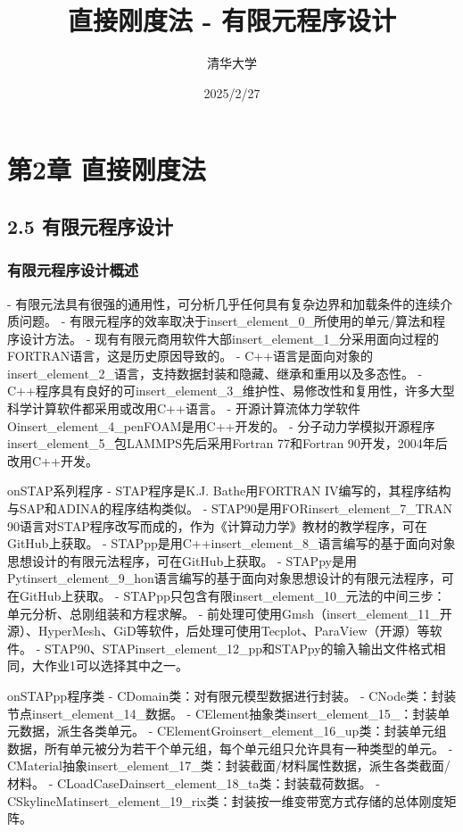 \documentclass{article}
\title{直接刚度法 - 有限元程序设计}
\author{清华大学}
\date{2025/2/27}
\begin{document}
\maketitle

\section{第2章 直接刚度法}
\subsection{2.5 有限元程序设计}

\subsubsection{有限元程序设计概述}
- 有限元法具有很强的通用性，可分析几乎任何具有复杂边界和加载条件的连续介质问题。
- 有限元程序的效率取决于{insert\_element\_0\_}所使用的单元/算法和程序设计方法。
- 现有有限元商用软件大部{insert\_element\_1\_}分采用面向过程的FORTRAN语言，这是历史原因导致的。
- C++语言是面向对象的{insert\_element\_2\_}语言，支持数据封装和隐藏、继承和重用以及多态性。
- C++程序具有良好的可{insert\_element\_3\_}维护性、易修改性和复用性，许多大型科学计算软件都采用或改用C++语言。
- 开源计算流体力学软件O{insert\_element\_4\_}penFOAM是用C++开发的。
- 分子动力学模拟开源程序{insert\_element\_5\_}包LAMMPS先后采用Fortran 77和Fortran 90开发，2004年后改用C++开发。

on{STAP系列程序}
- STAP程序是K.J. Bathe用FORTRAN IV编写的，其程序结构与SAP和ADINA的程序结构类似。
- STAP90是用FOR{insert\_element\_7\_}TRAN 90语言对STAP程序改写而成的，作为《计算动力学》教材的教学程序，可在GitHub上获取。
- STAPpp是用C++{insert\_element\_8\_}语言编写的基于面向对象思想设计的有限元法程序，可在GitHub上获取。
- STAPpy是用Pyt{insert\_element\_9\_}hon语言编写的基于面向对象思想设计的有限元法程序，可在GitHub上获取。
- STAPpp只包含有限{insert\_element\_10\_}元法的中间三步：单元分析、总刚组装和方程求解。
- 前处理可使用Gmsh（{insert\_element\_11\_}开源）、HyperMesh、GiD等软件，后处理可使用Tecplot、ParaView（开源）等软件。
- STAP90、STAP{insert\_element\_12\_}pp和STAPpy的输入输出文件格式相同，大作业1可以选择其中之一。

on{STAPpp程序类}
- CDomain类：对有限元模型数据进行封装。
- CNode类：封装节点{insert\_element\_14\_}数据。
- CElement抽象类{insert\_element\_15\_}：封装单元数据，派生各类单元。
- CElementGro{insert\_element\_16\_}up类：封装单元组数据，所有单元被分为若干个单元组，每个单元组只允许具有一种类型的单元。
- CMaterial抽象{insert\_element\_17\_}类：封装截面/材料属性数据，派生各类截面/材料。
- CLoadCaseDa{insert\_element\_18\_}ta类：封装载荷数据。
- CSkylineMat{insert\_element\_19\_}rix类：封装按一维变带宽方式存储的总体刚度矩阵。
\end{document}
